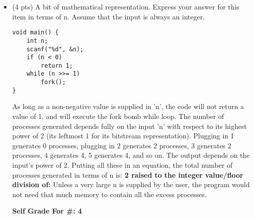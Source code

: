 \documentclass[conference]{IEEEtran}
\begin{document}
\begin{itemize}
\item (4 pts) A bit of mathematical representation. Express your answer for this item in terms of n. Assume that the input is always an integer.
\begin{lstlisting}
void main() {
    int n;
    scanf("%d", &n);
    if (n < 0)
        return 1;
    while (n >>= 1)
        fork();
}
\end{lstlisting}
As long as a non-negative value is supplied in 'n', the code will not return a value of 1, and will execute the fork bomb while loop. The number of processes generated depends fully on the input 'n' with respect to its highest power of 2 (its leftmost 1 for its bitstream representation). Plugging in 1 generates 0 processes, plugging in 2 generates 2 processes, 3 generates 2 processes, 4 generates 4, 5 generates 4, and so on. The output depends on the input's power of 2. Putting all these in an equation, the total number of processes generated in terms of n is: \textbf{2 raised to the integer value/floor division of: }Unless a very large n is supplied by the user, the program would not need that much memory to contain all the excess processes.
	\begin{center}
		\textbf{Self Grade For \#: 4}
	\end{center}
\end{itemize}
\end{document}
